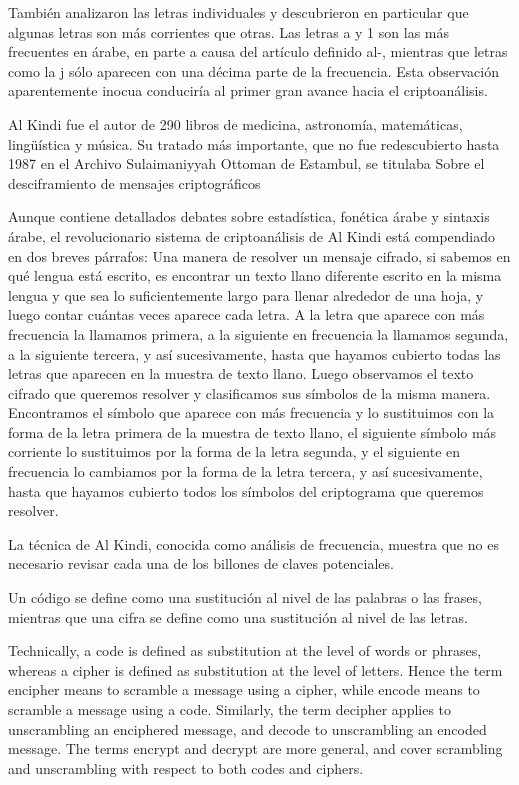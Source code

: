 	 También analizaron las letras individuales y descubrieron en particular que algunas letras son más corrientes que otras. Las letras a y 1 son las más frecuentes en árabe, en parte a causa del artículo definido al-, mientras que letras como la j sólo aparecen con una décima parte de la frecuencia. Esta observación aparentemente inocua conduciría al primer gran avance hacia el criptoanálisis.
	 
		Al Kindi fue el autor de 290 libros de medicina, astronomía, matemáticas, lingüística y música. Su tratado más importante, que no fue redescubierto hasta 1987 en el Archivo Sulaimaniyyah Ottoman de Estambul, se titulaba Sobre el desciframiento de mensajes criptográficos	 
	 
	 
	 Aunque contiene detallados debates sobre estadística, fonética árabe y sintaxis árabe,  el revolucionario sistema de criptoanálisis de Al Kindi está compendiado en dos breves párrafos: Una manera de resolver un mensaje cifrado, si sabemos en qué lengua está escrito, es encontrar un texto llano diferente escrito en la misma lengua y que sea lo suficientemente largo para llenar alrededor de una hoja, y luego contar cuántas veces aparece cada letra. A la letra que aparece con más frecuencia la llamamos primera, a la siguiente en frecuencia la llamamos segunda, a la siguiente tercera, y así sucesivamente, hasta que hayamos cubierto todas las letras que aparecen en la muestra de texto llano. Luego observamos el texto cifrado que queremos resolver y clasificamos sus símbolos de la misma manera. Encontramos el símbolo que aparece con más frecuencia y lo sustituimos con la forma de la letra primera de la muestra de texto llano, el siguiente símbolo más corriente lo sustituimos por la forma de la letra segunda, y el siguiente en frecuencia lo cambiamos por la forma de la letra tercera, y así sucesivamente, hasta que hayamos cubierto todos los símbolos del criptograma que queremos resolver.
	 
	 La técnica de Al Kindi, conocida como análisis de frecuencia, muestra que no es necesario revisar cada una de los billones de claves potenciales.
	 
	  Un código se define como una sustitución al nivel de las palabras o las frases, mientras que una cifra se define como una sustitución al nivel de las letras. 
	  
	  
	  Technically, a code is defined as substitution at the level of words or phrases, whereas a cipher is defined as substitution at the level of letters. Hence the term encipher means to scramble a message using a cipher, while encode means to scramble a message using a code. Similarly, the term decipher applies to unscrambling an enciphered message, and decode to unscrambling an encoded message. The terms encrypt and decrypt are more general, and cover scrambling and unscrambling with respect to both codes and ciphers.
	  
